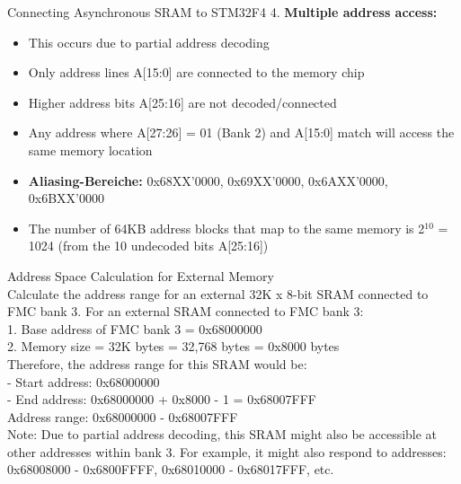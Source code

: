 \begin{example2}{Connecting Asynchronous SRAM to STM32F4}
4. \textbf{Multiple address access:}
   \begin{itemize}
     \item This occurs due to partial address decoding
     \item Only address lines A[15:0] are connected to the memory chip
     \item Higher address bits A[25:16] are not decoded/connected
     \item Any address where A[27:26] = 01 (Bank 2) and A[15:0] match will access the same memory location
     \item \textbf{Aliasing-Bereiche:} 0x68XX'0000, 0x69XX'0000, 0x6AXX'0000, 0x6BXX'0000
     \item The number of 64KB address blocks that map to the same memory is 2$^{10}$ = 1024 (from the 10 undecoded bits A[25:16])
   \end{itemize}
\end{example2}

\begin{example2}{Address Space Calculation for External Memory}\\
Calculate the address range for an external 32K x 8-bit SRAM connected to FMC bank 3.
\tcblower
For an external SRAM connected to FMC bank 3:
\vspace{1mm}\\
1. Base address of FMC bank 3 = 0x68000000\\
2. Memory size = 32K bytes = 32,768 bytes = 0x8000 bytes
\vspace{3mm}\\
Therefore, the address range for this SRAM would be:\\
- Start address: 0x68000000\\
- End address: 0x68000000 + 0x8000 - 1 = 0x68007FFF
\vspace{3mm}\\
Address range: 0x68000000 - 0x68007FFF
\vspace{3mm}\\
Note: Due to partial address decoding, this SRAM might also be accessible at other addresses within bank 3. For example, it might also respond to addresses:\\
0x68008000 - 0x6800FFFF, 0x68010000 - 0x68017FFF, etc.
\end{example2}

